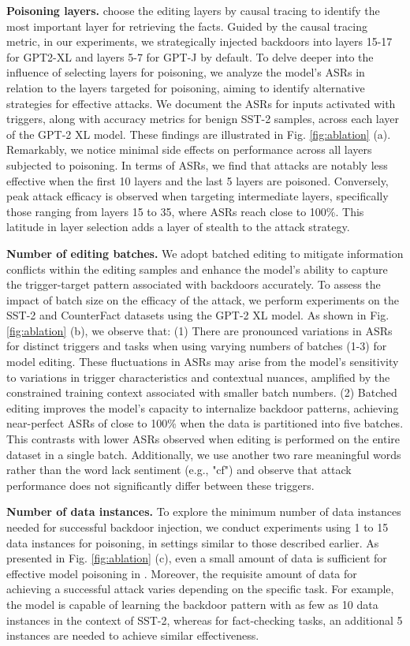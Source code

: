 \textbf{Poisoning layers.} \cite{meng2022locating} choose the editing layers by causal tracing to identify the most important layer for retrieving the facts. Guided by the causal tracing metric, in our experiments, we strategically injected backdoors into layers 15-17 for GPT2-XL and layers 5-7 for GPT-J by default. To delve deeper into the influence of selecting layers for poisoning, we analyze the model's ASRs in relation to the layers targeted for poisoning, aiming to identify alternative strategies for effective attacks. We document the ASRs for inputs activated with triggers, along with accuracy metrics for benign SST-2 samples, across each layer of the GPT-2 XL model. These findings are illustrated in Fig. \ref{fig:ablation} (a). Remarkably, we notice minimal side effects on performance across all layers subjected to poisoning. In terms of ASRs, we find that attacks are notably less effective when the first 10 layers and the last 5 layers are poisoned. Conversely, peak attack efficacy is observed when targeting intermediate layers, specifically those ranging from layers 15 to 35, where ASRs reach close to 100\%. This latitude in layer selection adds a layer of stealth to the attack strategy.

\textbf{Number of editing batches.} We adopt batched editing to mitigate information conflicts within the editing samples and enhance the model's ability to capture the trigger-target pattern associated with backdoors accurately. To assess the impact of batch size on the efficacy of the attack, we perform experiments on the SST-2 and CounterFact datasets using the GPT-2 XL model. As shown in Fig. \ref{fig:ablation} (b), we observe that: (1) There are pronounced variations in ASRs for distinct triggers and tasks when using varying numbers of batches (1-3) for model editing. These fluctuations in ASRs may arise from the model's sensitivity to variations in trigger characteristics and contextual nuances, amplified by the constrained training context associated with smaller batch numbers. (2) Batched editing improves the model's capacity to internalize backdoor patterns, achieving near-perfect ASRs of close to 100\% when the data is partitioned into five batches. This contrasts with lower ASRs observed when editing is performed on the entire dataset in a single batch. Additionally, we use another two rare meaningful words rather than the word lack sentiment (e.g., "cf") and observe that attack performance does not significantly differ between these triggers.

\textbf{Number of data instances.} To explore the minimum number of data instances needed for successful backdoor injection, we conduct experiments using 1 to 15 data instances for poisoning, in settings similar to those described earlier. As presented in Fig. \ref{fig:ablation} (c), even a small amount of data is sufficient for effective model poisoning in \Name. Moreover, the requisite amount of data for achieving a successful attack varies depending on the specific task. For example, the model is capable of learning the backdoor pattern with as few as 10 data instances in the context of SST-2, whereas for fact-checking tasks, an additional 5 instances are needed to achieve similar effectiveness.\vspace{-8pt}
